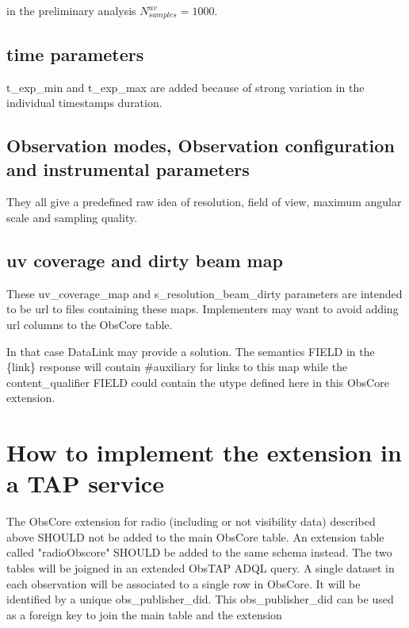 \documentclass[11pt,a4paper]{ivoa}
\begin{document}
in the preliminary analysis $N^{uv}_{samples} = 1000$.



\subsection{time parameters}

t\_exp\_min and t\_exp\_max are added because of strong variation in the individual timestamps 
duration.
\subsection{Observation modes, Observation configuration and instrumental parameters}

They all give a predefined raw idea of resolution, field of view, maximum angular scale and 
sampling quality.

\subsection{uv coverage and dirty beam map}

These uv\_coverage\_map and s\_resolution\_beam\_dirty parameters are  intended to be url to 
files containing these maps. 
Implementers may want to avoid adding url columns to the ObsCore table. 

In that case DataLink \citep{std:DataLink} may provide a solution. The semantics FIELD in the 
\{link\} response  will contain \#auxiliary  for links to this map while  the content\_qualifier 
FIELD could contain the utype defined here in this ObsCore extension.


\section{How to implement the extension in a TAP service}

The ObsCore extension for radio (including or not visibility data) described above SHOULD not be added to the main ObsCore table. An extension table called "radioObscore" SHOULD be added to the same schema instead. The two tables will be joigned in an extended ObsTAP ADQL query. A single dataset in each observation will be associated to a single row in ObsCore. It will be identified by a unique obs\_publisher\_did. This obs\_publisher\_did can be used as a foreign key to join the main table and the extension
\end{document}
